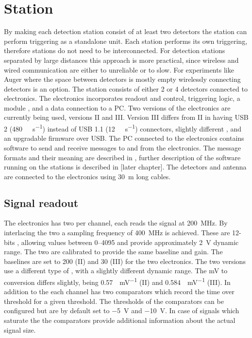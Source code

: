 \section{Station}

By making each detection station consist of at least two detectors the station can perform triggering as a standalone unit. Each station performs its own triggering, therefore stations do not need to be interconnected. For detection stations separated by large distances this approach is more practical, since wireless and wired communication are either to unreliable or to slow. For experiments like Auger where the space between detectors is mostly empty wirelessly connecting detectors is an option. The \hisparc station consists of either 2 or 4 detectors connected to \hisparc electronics. The \hisparc electronics incorporates \pmt readout and control, triggering logic, a \gps module \cite{trimble2007resolutiont}, and a data connection to a PC. Two versions of the electronics are currently being used, versions II and III. Version III differs from II in having USB 2 (\SI{480}{\mega\bit\per\second}) instead of USB 1.1 (\SI{12}{\mega\bit\per\second}) connectors, slightly different \adcs, and an upgradable firmware over USB. The PC connected to the electronics contains software to send and receive messages to and from the \hisparc electronics. The message formats and their meaning are described in \cite{verkooijen2008firmware}, further description of the software running on the stations is described in [later chapter]. The detectors and \gps antenna \cite{trimble2015bullet} are connected to the electronics using \SI{30}{\meter} long cables.

\subsection{Signal readout}

The \hisparc electronics has two \adcs per channel, each reads the \pmt signal at \SI{200}{\mega\hertz}. By interlacing the two \adcs a sampling frequency of \SI{400}{\mega\hertz} is achieved. These are 12-bits \adcs, allowing values between \SIrange{0}{4095}{\adc} and provide approximately \SI{2}{\volt} dynamic range. The two \adcs are calibrated to provide the same baseline and gain. The baselines are set to \SI{200}{\adc} (II) and \SI{30}{\adc} (III) for the two \hisparc electronics. The two versions use a different type of \adc, with a slightly different dynamic range. The \si{\mV} to \si{\adc} conversion differs slightly, being \SI{0.57}{\adc\per\mV} (II) and \SI{0.584}{\adc\per\mV} (III). In addition to the \adcs each channel has two comparators which record the time over threshold for a given threshold. The thresholds of the comparators can be configured but are by default set to \SI{-5}{\volt} and \SI{-10}{\volt}. In case of signals which saturate the \adcs the comparators provide additional information about the actual signal size.

